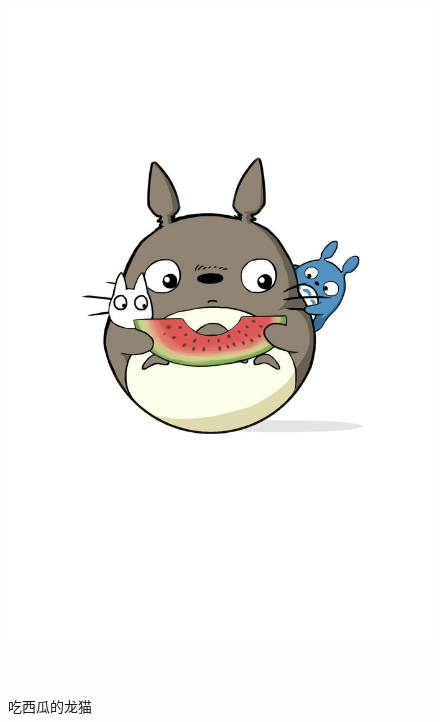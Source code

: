 \documentclass[12pt]{ctexart}
\begin{document}
\begin{spacing}{1.5}
\begin{figure}[h]
\begin{minipage}[t]{0.3\linewidth}
		\includegraphics[width=1\textwidth]{figures/3.jpg}
		\caption*{吃西瓜的龙猫}
	\end{minipage} 
	\begin{minipage}[t]{0.3\linewidth}

\end{minipage}
\end{figure}
\end{spacing}
\end{document}
